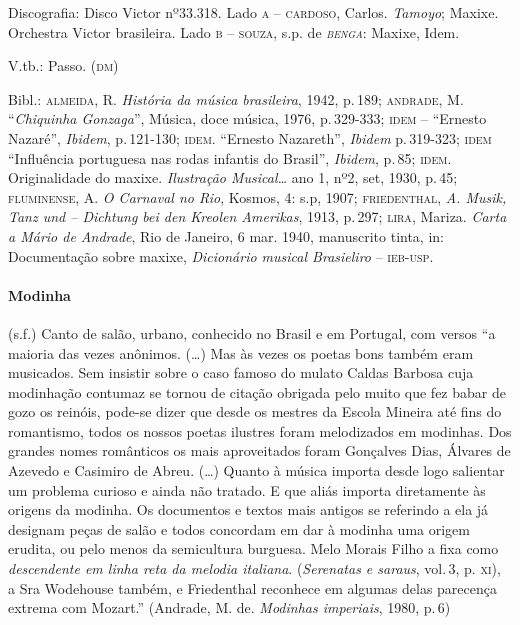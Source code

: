 Discografia: Disco Victor nº33.318. Lado \textsc{a} -- \textsc{cardoso}, Carlos.
\emph{Tamoyo}; Maxixe. Orchestra Victor brasileira. Lado \textsc{b} -- \textsc{souza},
s.p. de \emph{\textsc{benga}}: Maxixe, Idem.

V.tb.: Passo. (\textsc{dm})

Bibl.: \textsc{almeida}, R. \emph{História da música brasileira}, 1942, p.\,189;
\textsc{andrade}, M. ``\emph{Chiquinha Gonzaga}'', Música, doce música, 1976,
p.\,329-333; \textsc{idem} -- ``Ernesto Nazaré'', \emph{Ibidem}, p.\,121-130; \textsc{idem}.
``Ernesto Nazareth'', \emph{Ibidem} p.\,319-323; \textsc{idem} ``Influência portuguesa
nas rodas infantis do Brasil'', \emph{Ibidem}, p.\,85; \textsc{idem}. Originalidade
do maxixe. \emph{Ilustração Musical\ldots{}} ano 1, nº2, set, 1930, p.\,45;
\textsc{fluminense}, A. \emph{O Carnaval no Rio}, Kosmos, 4: s.p, 1907;
\textsc{friedenthal}, \emph{A. Musik, Tanz und -- Dichtung bei den Kreolen
Amerikas}, 1913, p.\,297; \textsc{lira}, Mariza. \emph{Carta a Mário de Andrade},
Rio de Janeiro, 6 mar. 1940, manuscrito tinta, in: Documentação sobre
maxixe, \emph{Dicionário musical Brasieliro} -- \textsc{ieb-usp}.

\paragraph{Modinha} (s.f.) Canto de salão, urbano, conhecido no Brasil e
em Portugal, com versos ``a maioria das vezes anônimos. (\ldots{}) Mas às
vezes os poetas bons também eram musicados. Sem insistir sobre o caso
famoso do mulato Caldas Barbosa cuja modinhação contumaz se tornou de
citação obrigada pelo muito que fez babar de gozo os reinóis, pode-se
dizer que desde os mestres da Escola Mineira até fins do romantismo,
todos os nossos poetas ilustres foram melodizados em modinhas. Dos
grandes nomes românticos os mais aproveitados foram Gonçalves Dias,
Álvares de Azevedo e Casimiro de Abreu. (\ldots{}) Quanto à música importa
desde logo salientar um problema curioso e ainda não tratado. E que
aliás importa diretamente às origens da modinha. Os documentos e textos
mais antigos se referindo a ela já designam peças de salão e todos
concordam em dar à modinha uma origem erudita, ou pelo menos da
semicultura burguesa. Melo Morais Filho a fixa como \textit{descendente em
linha reta da melodia italiana}. (\emph{Serenatas e saraus}, vol.\,3, p.
\textsc{xi}), a Sra Wodehouse também, e Friedenthal reconhece em algumas delas
parecença extrema com Mozart.'' (Andrade, M. de. \emph{Modinhas
imperiais}, 1980, p.\,6)

